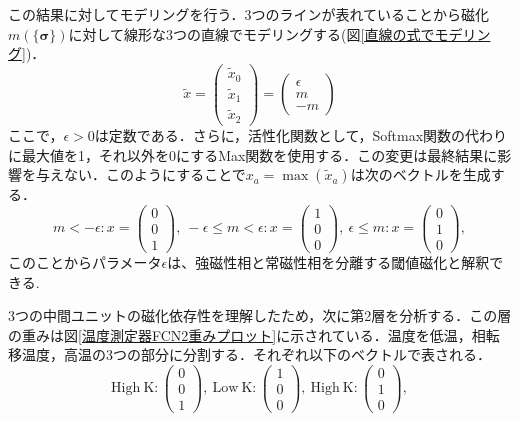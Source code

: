 \documentclass[a4paper,11pt]{jsreport}
\begin{document}
この結果に対してモデリングを行う．3つのラインが表れていることから磁化$m(\{\bm{\sigma}\})$に対して線形な3つの直線でモデリングする(図\ref{直線の式でモデリング})．
\begin{equation}
  \tilde{x} =
  \begin{pmatrix}
    \tilde{x}_0 \\ \tilde{x}_1 \\ \tilde{x}_2
  \end{pmatrix}
  =
  \begin{pmatrix}
    \epsilon \\ m \\ -m
  \end{pmatrix}
\end{equation}
ここで，$\epsilon > 0$は定数である．さらに，活性化関数として，Softmax関数の代わりに最大値を1，それ以外を0にするMax関数を使用する．この変更は最終結果に影響を与えない．このようにすることで$x_a = \max{(\tilde{x}_a)}$は次のベクトルを生成する．
\begin{equation}
  m<-\epsilon : x=
  \begin{pmatrix}
    0 \\ 0 \\ 1
  \end{pmatrix}, \
  -\epsilon \leq m < \epsilon : x=
  \begin{pmatrix}
    1 \\ 0 \\ 0
  \end{pmatrix}, \
  \epsilon \leq m : x=
  \begin{pmatrix}
    0 \\ 1 \\ 0
  \end{pmatrix},
\end{equation}
このことからパラメータ$\epsilon$は、強磁性相と常磁性相を分離する閾値磁化と解釈できる.\par
3つの中間ユニットの磁化依存性を理解したため，次に第2層を分析する．この層の重みは図\ref{温度測定器FCN2重みプロット}に示されている．温度を低温，相転移温度，高温の3つの部分に分割する．それぞれ以下のベクトルで表される．
\begin{equation}
  \text{High} \ \text{K} :
  \begin{pmatrix}
    0 \\ 0 \\ 1
  \end{pmatrix}, \
  \text{Low} \ \text{K} :
  \begin{pmatrix}
    1 \\ 0 \\ 0
  \end{pmatrix}, \
  \text{High} \ \text{K} :
  \begin{pmatrix}
    0 \\ 1 \\ 0
  \end{pmatrix},
\end{equation}
\end{document}
